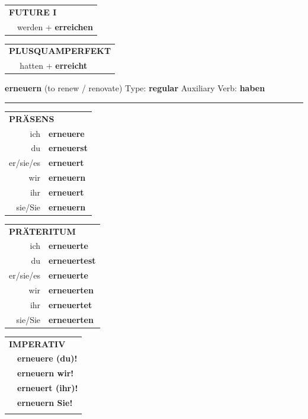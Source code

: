 \documentclass[10pt,a4paper]{revtex4-2}
\begin{document}
\begin{verbbox-acc}
\begin{tabular}{rl}
    \multicolumn{2}{l}{\textbf{FUTURE I} }\\
  &  werden + \textbf{erreichen}\\
 
  \end{tabular}
\hfill
   \begin{tabular}{rl}
      \multicolumn{2}{l}{\textbf{PLUSQUAMPERFEKT}}\\
  &  hatten + \textbf{erreicht}\\
  \end{tabular}
  
  \vspace{-5pt}


\end{verbbox-acc}

\begin{verbbox}
    {\Large \bf erneuern} (to renew / renovate) \hfill Type: \textbf{regular} \hfill Auxiliary Verb: \textbf{haben} 
    
     \vspace{5pt}

    \hrule
    
    \vspace{5pt}

  \begin{tabular}{rl}
     \multicolumn{2}{l}{\textbf{PRÄSENS} }\\
    ich & \textbf{erneuere}\\
    du & \textbf{erneuerst}\\
    er/sie/es & \textbf{erneuert}\\
    wir & \textbf{erneuern}\\
    ihr & \textbf{erneuert}\\
    sie/Sie & \textbf{erneuern}\\
  \end{tabular}
  \hfill
  \begin{tabular}{rl}
    \multicolumn{2}{l}{\textbf{PRÄTERITUM} }\\
    ich & \textbf{erneuerte}\\
    du & \textbf{erneuertest}\\
    er/sie/es & \textbf{erneuerte}\\
    wir & \textbf{erneuerten}\\
    ihr & \textbf{erneuertet}\\
    sie/Sie & \textbf{erneuerten}\\
  \end{tabular}
  \hfill
  \begin{tabular}{rl}
     \multicolumn{2}{l}{\textbf{IMPERATIV} }\\
   & \textbf{erneuere (du)!}\\
   & \textbf{erneuern wir!}\\
   & \textbf{erneuert (ihr)!}\\
   & \textbf{erneuern Sie!}\\
   & \vspace{10pt}
  \end{tabular}


\end{verbbox}
\end{document}
